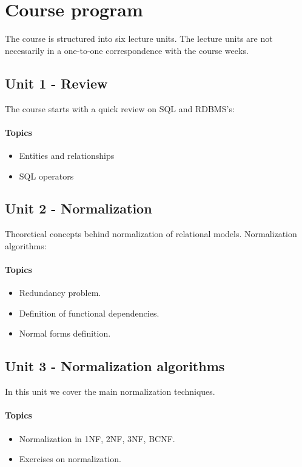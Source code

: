 \section{Course program}
	The course is structured into six lecture units. The lecture units are not necessarily in a one-to-one correspondence with the course weeks.

	\subsection{Unit 1 - Review}
		The course starts with a quick review on SQL and RDBMS's:

		\paragraph*{Topics}
			\begin{itemize}
				\item Entities and relationships
				\item SQL operators
			\end{itemize}
			
	\subsection{Unit 2 - Normalization}
		Theoretical concepts behind normalization of relational models. Normalization algorithms:

		\paragraph*{Topics}
			\begin{itemize}
				\item Redundancy problem.
				\item Definition of functional dependencies.
				\item Normal forms definition.
			\end{itemize}

	\subsection{Unit 3 - Normalization algorithms}
		In this unit we cover the main normalization techniques.
		\paragraph*{Topics}
		\begin{itemize}
			\item Normalization in 1NF, 2NF, 3NF, BCNF.
			\item Exercises on normalization.
		\end{itemize}		


